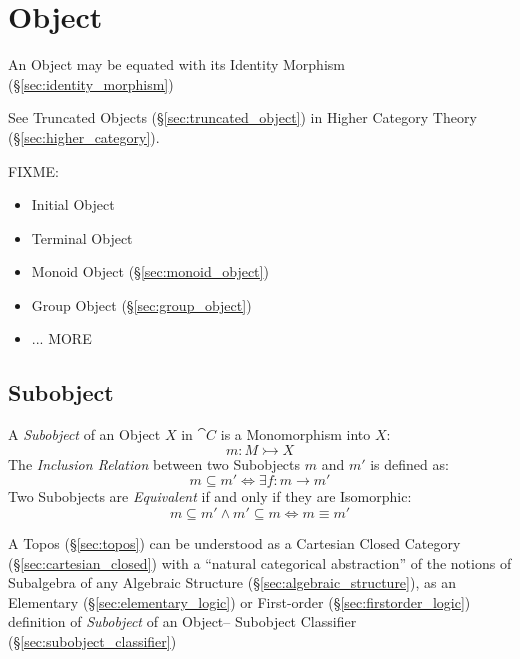 \section{Object}\label{sec:category_object}

An Object may be equated with its Identity Morphism
(\S\ref{sec:identity_morphism})

\fist See Truncated Objects (\S\ref{sec:truncated_object}) in Higher
Category Theory (\S\ref{sec:higher_category}).

FIXME:

\begin{itemize}
  \item Initial Object
  \item Terminal Object
  \item Monoid Object (\S\ref{sec:monoid_object})
  \item Group Object (\S\ref{sec:group_object})
  \item ... MORE
\end{itemize}



\subsection{Subobject}\label{sec:subobject}

A \emph{Subobject} of an Object $X$ in $\cat{C}$ is a Monomorphism
into $X$:
\[
  m : M \rightarrowtail X
\]
The \emph{Inclusion Relation} between two Subobjects $m$ and $m'$ is
defined as:
\[
  m \subseteq m' \Leftrightarrow \exists f : m \rightarrow m'
\]
Two Subobjects are \emph{Equivalent} if and only if they are
Isomorphic:
\[
  m \subseteq m' \wedge m' \subseteq m \Leftrightarrow m \equiv m'
\]

\fist A Topos (\S\ref{sec:topos}) can be understood as a Cartesian Closed
Category (\S\ref{sec:cartesian_closed}) with a ``natural categorical
abstraction'' of the notions of Subalgebra of any Algebraic Structure
(\S\ref{sec:algebraic_structure}), as an Elementary
(\S\ref{sec:elementary_logic}) or First-order (\S\ref{sec:firstorder_logic})
definition of \emph{Subobject} of an Object-- Subobject Classifier
(\S\ref{sec:subobject_classifier})

